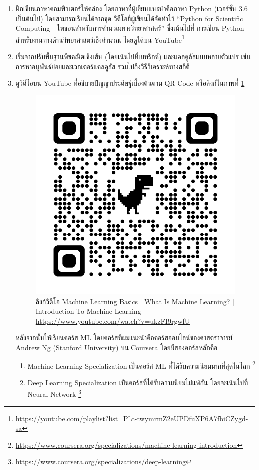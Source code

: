 \begin{enumerate}
    \item ฝึกเขียนภาษาคอมพิวเตอร์ให้คล่อง โดยภาษาที่ผู้เขียนแนะนำคือภาษา Python (เวอร์ชั่น 3.6 เป็นต้นไป) โดยสามารถเรียนได้จากชุด%
    วิดีโอที่ผู้เขียนได้จัดทำไว้ \enquote{Python for Scientific Computing - ไพธอนสำหรับการคำนวณทางวิทยาศาสตร์} ซึ่งเน้นไปที่%
    การเขียน Python สำหรับงานทางด้านวิทยาศาสตร์เชิงคำนวณ โดยดูได้บน YouTube\footnote{%
    \url{https://youtube.com/playlist?list=PLt-twymrmZ2eUPDfuXP6A7fbiCZygd-sa}}

    \item เริ่มจากปรับพื้นฐานพีชคณิตเชิงเส้น (โดยเน้นไปที่เมทริกซ์) และแคลคูลัสแบบหลายตัวแปร เช่น การหาอนุพันธ์ย่อยและเวกเตอร์แคลคูลัส 
    รวมไปถึงวิธีวิเคราะห์ทางสถิติ
    
    \item ดูวิดีโอบน YouTube ที่อธิบายปัญญาประดิษฐ์เบื้องต้นตาม QR Code หรือลิงก์ในภาพที่ \ref{fig:qr_code_intro_ml}
    
    \begin{figure}[htbp]
        \centering
        \includegraphics[width=0.3\linewidth]{fig/qr_code_intro_ml.png}
        \caption{ลิงก์วิดีโอ Machine Learning Basics | What Is Machine Learning? | Introduction To Machine 
        Learning \url{https://www.youtube.com/watch?v=ukzFI9rgwfU}}
        \label{fig:qr_code_intro_ml}
    \end{figure}

    หลังจากนั้นให้เรียนคอร์ส ML โดยคอร์สที่ผมแนะนำคือคอร์สออนไลน์ของศาสตราจารย์ Andrew Ng (Stanford University) บน Coursera 
    โดยมีสองคอร์สหลักคือ 
    \begin{enumerate}
        \item Machine Learning Specialization เป็นคอร์ส ML ที่ได้รับความนิยมมากที่สุดในโลก%
        \footnote{\url{https://www.coursera.org/specializations/machine-learning-introduction}}
        \item Deep Learning Specialization เป็นคอร์สที่ได้รับความนิยมไม่แพ้กัน โดยจะเน้นไปที่ Neural Network%
        \footnote{\url{https://www.coursera.org/specializations/deep-learning}}
    \end{enumerate}


\end{enumerate}
